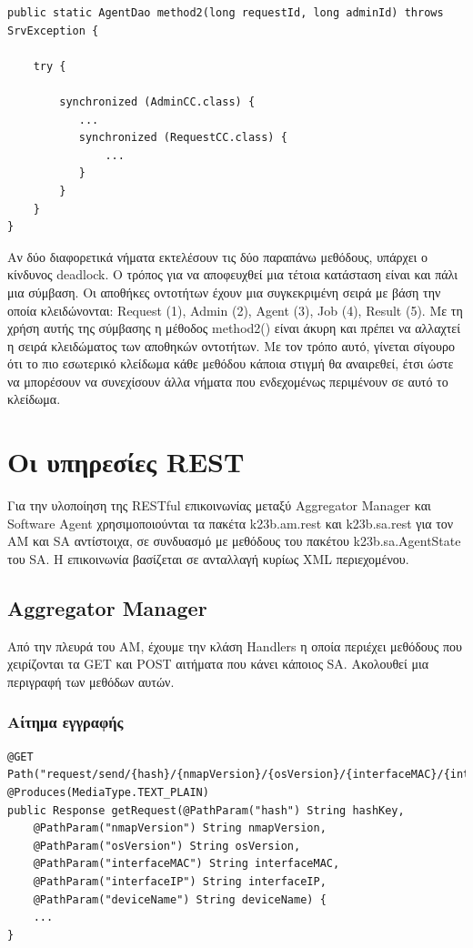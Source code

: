 \documentclass[a4paper,11pt]{article}
\begin{document}
\begin{sloppypar}
\begin{lstlisting}
public static AgentDao method2(long requestId, long adminId) throws SrvException {

    try {

        synchronized (AdminCC.class) {
           ...
           synchronized (RequestCC.class) {
               ...
           }
        }
    }
}   
\end{lstlisting}
Αν δύο διαφορετικά νήματα εκτελέσουν τις δύο παραπάνω μεθόδους, υπάρχει ο κίνδυνος deadlock. Ο τρόπος για να αποφευχθεί μια τέτοια κατάσταση είναι και πάλι μια σύμβαση. Οι αποθήκες οντοτήτων έχουν μια συγκεκριμένη σειρά με βάση την οποία κλειδώνονται: Request (1), Admin (2), Agent (3), Job (4), Result (5). Με τη χρήση αυτής της σύμβασης η μέθοδος method2() είναι άκυρη και πρέπει να αλλαχτεί η σειρά κλειδώματος των αποθηκών οντοτήτων. Με τον τρόπο αυτό, γίνεται σίγουρο ότι το πιο εσωτερικό κλείδωμα κάθε μεθόδου κάποια στιγμή θα αναιρεθεί, έτσι ώστε να μπορέσουν να συνεχίσουν άλλα νήματα που ενδεχομένως περιμένουν σε αυτό το κλείδωμα.

\newpage


\section{Οι υπηρεσίες REST}

Για την υλοποίηση της RESTful επικοινωνίας μεταξύ Aggregator Manager και Software Agent χρησιμοποιούνται τα πακέτα k23b.am.rest και k23b.sa.rest για τον ΑΜ και SA αντίστοιχα, σε συνδυασμό με μεθόδους του πακέτου k23b.sa.AgentState του SA. Η επικοινωνία βασίζεται σε ανταλλαγή κυρίως XML περιεχομένου. 

\subsection{Aggregator Manager}

Από την πλευρά του ΑΜ, έχουμε την κλάση Handlers η οποία περιέχει μεθόδους που χειρίζονται τα GET και POST αιτήματα που κάνει κάποιος SA. Ακολουθεί μια περιγραφή των μεθόδων αυτών.

\subsubsection{Αίτημα εγγραφής}
\begin{lstlisting}
@GET
Path("request/send/{hash}/{nmapVersion}/{osVersion}/{interfaceMAC}/{interfaceIP}/{deviceName}")
@Produces(MediaType.TEXT_PLAIN)
public Response getRequest(@PathParam("hash") String hashKey,
    @PathParam("nmapVersion") String nmapVersion,
    @PathParam("osVersion") String osVersion,
    @PathParam("interfaceMAC") String interfaceMAC,
    @PathParam("interfaceIP") String interfaceIP,
    @PathParam("deviceName") String deviceName) {
    ...
}


\end{lstlisting}
\end{sloppypar}
\end{document}
